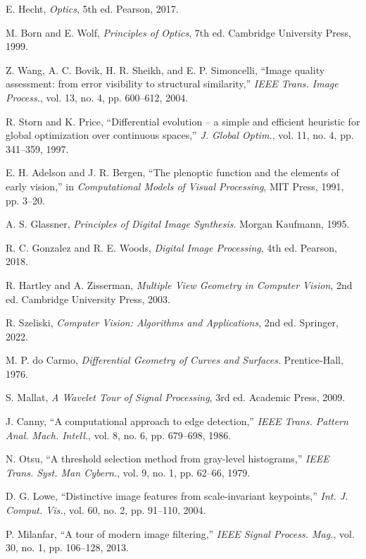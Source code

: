  E. Hecht, \textit{Optics}, 5th ed. Pearson, 2017.

 M. Born and E. Wolf, \textit{Principles of Optics}, 7th ed. Cambridge University Press, 1999.

 Z. Wang, A. C. Bovik, H. R. Sheikh, and E. P. Simoncelli, ``Image quality assessment: from error visibility to structural similarity,'' \textit{IEEE Trans. Image Process.}, vol. 13, no. 4, pp. 600--612, 2004.

 R. Storn and K. Price, ``Differential evolution -- a simple and efficient heuristic for global optimization over continuous spaces,'' \textit{J. Global Optim.}, vol. 11, no. 4, pp. 341--359, 1997.

 E. H. Adelson and J. R. Bergen, ``The plenoptic function and the elements of early vision,'' in \textit{Computational Models of Visual Processing}, MIT Press, 1991, pp. 3--20.

 A. S. Glassner, \textit{Principles of Digital Image Synthesis}. Morgan Kaufmann, 1995.

 R. C. Gonzalez and R. E. Woods, \textit{Digital Image Processing}, 4th ed. Pearson, 2018.

 R. Hartley and A. Zisserman, \textit{Multiple View Geometry in Computer Vision}, 2nd ed. Cambridge University Press, 2003.

 R. Szeliski, \textit{Computer Vision: Algorithms and Applications}, 2nd ed. Springer, 2022.

 M. P. do Carmo, \textit{Differential Geometry of Curves and Surfaces}. Prentice-Hall, 1976.

 S. Mallat, \textit{A Wavelet Tour of Signal Processing}, 3rd ed. Academic Press, 2009.

 J. Canny, ``A computational approach to edge detection,'' \textit{IEEE Trans. Pattern Anal. Mach. Intell.}, vol. 8, no. 6, pp. 679--698, 1986.

 N. Otsu, ``A threshold selection method from gray-level histograms,'' \textit{IEEE Trans. Syst. Man Cybern.}, vol. 9, no. 1, pp. 62--66, 1979.

 D. G. Lowe, ``Distinctive image features from scale-invariant keypoints,'' \textit{Int. J. Comput. Vis.}, vol. 60, no. 2, pp. 91--110, 2004.

 P. Milanfar, ``A tour of modern image filtering,'' \textit{IEEE Signal Process. Mag.}, vol. 30, no. 1, pp. 106--128, 2013.
